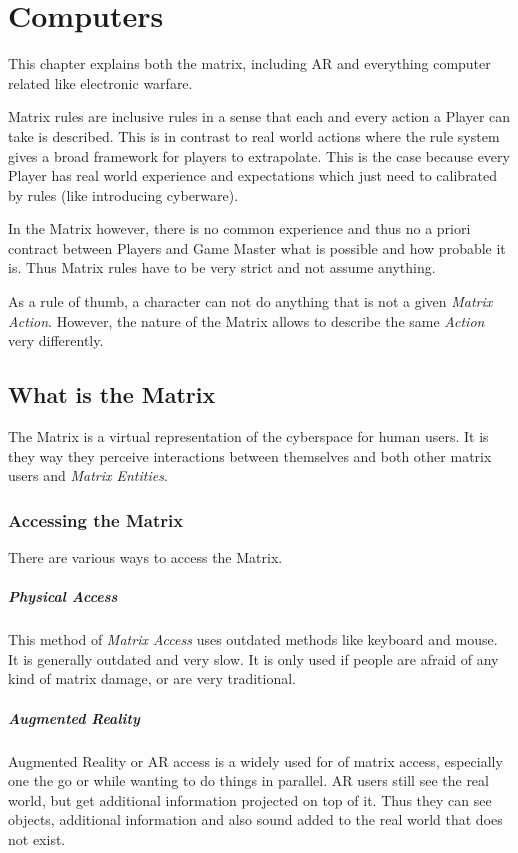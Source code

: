 \chapter{Computers}
\label{chap:basics}

This chapter explains both the matrix, including AR and everything computer related
like electronic warfare.

Matrix rules are inclusive rules in a sense that each and every action a Player
can take is described. This is in contrast to real world actions where the rule
system gives a broad framework for players to extrapolate. This is the case
because every Player has real world experience and expectations which just need to
calibrated by rules (like introducing cyberware).

In the Matrix however, there is no common experience and thus no a priori contract
between Players and Game Master what is possible and how probable it is.
Thus Matrix rules have to be very strict and not assume anything.

As a rule of thumb, a character can not do anything that is not a given
\emph{Matrix Action}. However, the nature of the Matrix allows to describe the
same \emph{Action} very differently.


\section{What is the Matrix}

The Matrix is a virtual representation of the cyberspace for human users. It is
they way they perceive interactions between themselves and both other matrix users
and \emph{Matrix Entities}.

\subsection{Accessing the Matrix}
\label{subsec:access matrix}

There are various ways to access the Matrix.

\paragraph{Physical Access}
This method of \emph{Matrix Access} uses outdated methods like keyboard and mouse.
It is generally outdated and very slow. It is only used if people are afraid of any kind of matrix
damage, or are very traditional.

\paragraph{Augmented Reality}
Augmented Reality or AR access is a widely used for of matrix access, especially one the go
or while wanting to do things in parallel. AR users still see the real world, but get additional
information projected on top of it. Thus they can see objects, additional information and also
sound added to the real world that does not exist.

